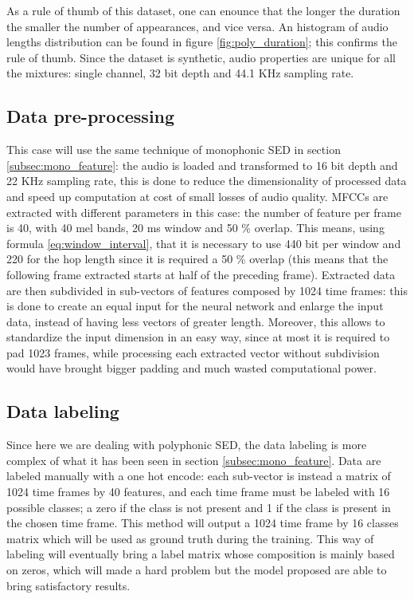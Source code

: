 \documentclass{article}
\begin{document}
As a rule of thumb of this dataset, one can enounce that the longer the duration the smaller the number of appearances, and vice versa. An histogram of audio lengths distribution can be found in figure \ref{fig:poly_duration}; this confirms the rule of thumb.\newline
Since the dataset is synthetic, audio properties are unique for all the mixtures: single channel, 32 bit depth and 44.1 KHz sampling rate.

\subsection{Data pre-processing}
\label{subsec:poly_feature}

This case will use the same technique of monophonic SED in section \ref{subsec:mono_feature}: the audio is loaded and transformed to 16 bit depth and 22 KHz sampling rate, this is done to reduce the dimensionality of processed data and speed up computation at cost of small losses of audio quality.\newline
MFCCs are extracted with different parameters in this case: the number of feature per frame is 40, with 40 mel bands, 20 ms window and 50 \% overlap. This means, using formula \ref{eq:window_interval}, that it is necessary to use 440 bit per window and 220 for the hop length since it is required a 50 \% overlap (this means that the following frame extracted starts at half of the preceding frame).\newline
Extracted data are then subdivided in sub-vectors of features composed by 1024 time frames: this is done to create an equal input for the neural network and enlarge the input data, instead of having less vectors of greater length. Moreover, this allows to standardize the input dimension in an easy way, since at most it is required to pad 1023 frames, while processing each extracted vector without subdivision would have brought bigger padding and much wasted computational power.

\subsection{Data labeling}
\label{subsec:poly_label}

Since here we are dealing with polyphonic SED, the data labeling is more complex of what it has been seen in section \ref{subsec:mono_feature}. Data are labeled manually with a one hot encode: each sub-vector is instead a matrix of 1024 time frames by 40 features, and each time frame must be labeled with 16 possible classes; a zero if the class is not present and 1 if the class is present in the chosen time frame. This method will output a 1024 time frame by 16 classes matrix which will be used as ground truth during the training. This way of labeling will eventually bring a label matrix whose composition is mainly based on zeros, which will made a hard problem but the model proposed are able to bring satisfactory results.
\end{document}
